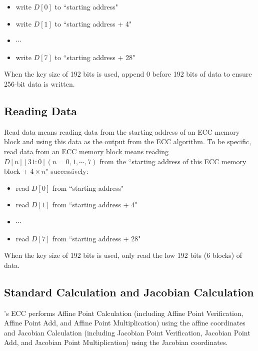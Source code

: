 \documentclass[main\_\_EN.tex]{subfiles}
\begin{document}
\begin{itemize}
    \item write $D[0]$ to ``starting address"
    \item write $D[1]$ to ``starting address + 4"
    \item $\cdots$
    \item write $D[7]$ to ``starting address + 28"
\end{itemize}

\begin{tiplisting}
When the key size of 192 bits is used, append 0 before 192 bits of data to ensure 256-bit data is written.
\end{tiplisting}

\subsection{Reading Data}

Read data means reading data from the starting address of an ECC memory block and using this data as the output from the ECC algorithm. To be specific, read data from an ECC memory block means reading $D[n][31:0] (n=0, 1, \cdots, 7)$ from the ``starting address of this ECC memory block + $4 \times n$" successively:
\begin{itemize}
    \item read $D[0]$ from ``starting address"
    \item read $D[1]$ from ``starting address + 4"
    \item $\cdots$
    \item read $D[7]$ from ``starting address + 28"
\end{itemize}

\begin{tiplisting}
When the key size of 192 bits is used, only read the low 192 bits (6 blocks) of data.
\end{tiplisting}


\subsection{Standard Calculation and Jacobian Calculation}

\chipname{}'s ECC performs Affine Point Calculation (including Affine Point Verification, Affine Point Add, and Affine Point Multiplication) using the affine coordinates and Jacobian Calculation (including Jacobian Point Verification, Jacobian Point Add, and Jacobian Point Multiplication) using the Jacobian coordinates.
\end{document}
